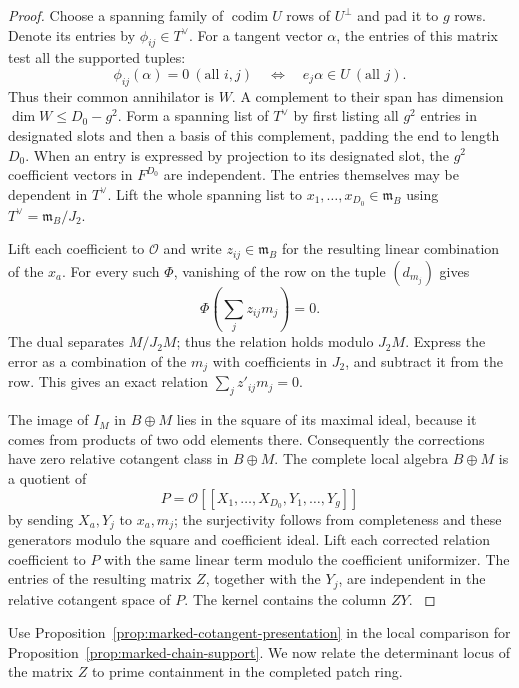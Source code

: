 \begin{proof}
Choose a spanning family of \(\operatorname{codim}U\) rows of
\(U^\perp\) and pad it to \(g\) rows. Denote its entries by
\(\phi_{ij}\in T^\vee\). For a tangent vector \(\alpha\), the entries of this matrix test all the supported tuples:
\[
 \phi_{ij}(\alpha)=0\ (\text{all }i,j)\quad\Longleftrightarrow\quad e_j\alpha\in U\ (\text{all }j).
\] Thus their common
annihilator is \(W\). A complement to their span has
dimension \(\dim W\le D_0-g^2\).
Form a spanning list of \(T^\vee\) by first listing all
\(g^2\) entries in designated slots and then a basis of this
complement, padding the end to length \(D_0\). When an entry
is expressed by projection to its designated slot, the
\(g^2\) coefficient vectors in \(F^{D_0}\) are independent.
The entries themselves may be dependent in \(T^\vee\).
Lift the whole spanning list to \(x_1,\ldots,x_{D_0}\in
\mathfrak m_B\) using \(T^\vee=\mathfrak m_B/J_2\).

Lift each coefficient to \(\mathcal O\) and write
\(z_{ij}\in\mathfrak m_B\) for the resulting linear
combination of the \(x_a\). For every such \(\Phi\), vanishing of the row on the tuple \((d_{m_j})\) gives
\[
 \Phi\!\left(\sum_j z_{ij}m_j\right)=0 .
\]
The dual separates \(M/J_2M\); thus the relation
holds modulo \(J_2M\).
Express the error as a combination of the
\(m_j\) with coefficients in \(J_2\), and
subtract it from the row. This gives an exact
relation \(\sum_j z'_{ij}m_j=0\).

The image of \(I_M\) in \(B\oplus M\) lies in the
square of its maximal ideal, because it comes from
products of two odd elements there. Consequently
the corrections have zero relative cotangent
class in \(B\oplus M\).
The complete local algebra \(B\oplus M\) is a
quotient of
\[
               P=\mathcal O[[X_1,\ldots,X_{D_0},Y_1,\ldots,Y_g]]
\]
by sending \(X_a,Y_j\) to \(x_a,m_j\); the
surjectivity follows from completeness and these
generators modulo the square and coefficient ideal.
Lift each corrected relation coefficient to
\(P\) with the same linear term modulo the
coefficient uniformizer. The entries of the
resulting matrix \(Z\), together with the \(Y_j\),
are independent in the relative cotangent space
of \(P\). The kernel contains the column \(ZY\).
 \label{cor:ordinary-patching-cotangent-13}

\end{proof}

Use Proposition~\ref{prop:marked-cotangent-presentation}
in the local comparison for
Proposition~\ref{prop:marked-chain-support}. We now relate
the determinant locus of the matrix \(Z\) to prime
containment in the completed patch ring.

